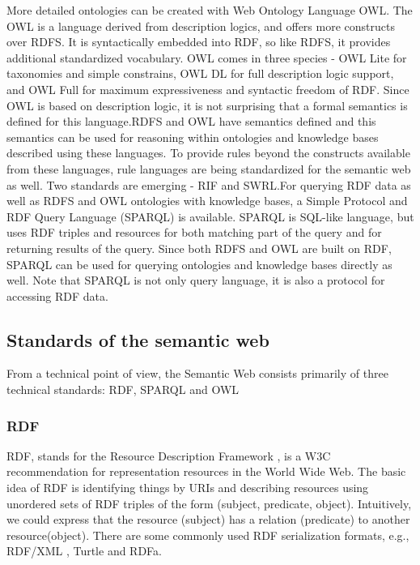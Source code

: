 \documentclass[a4paper,12pt,oneside]{report}
\begin{document}
{{More detailed ontologies can be created with Web Ontology Language OWL. The OWL is a language derived from description logics, and offers more constructs over RDFS. It is syntactically embedded into RDF, so like RDFS, it provides additional standardized vocabulary. OWL comes in three species - OWL Lite for taxonomies and simple constrains, OWL DL for full description logic support, and OWL Full for maximum expressiveness and syntactic freedom of RDF. Since OWL is based on description logic, it is not surprising that a formal semantics is defined for this language.RDFS and OWL have semantics defined and this semantics can be used for reasoning within ontologies and knowledge bases described using these languages. To provide rules beyond the constructs available from these languages, rule languages are being standardized for the semantic web as well. Two standards are emerging - RIF and SWRL.For querying RDF data as well as RDFS and OWL ontologies with knowledge bases, a Simple Protocol and RDF Query Language (SPARQL) is available. SPARQL is SQL-like language, but uses RDF triples and resources for both matching part of the query and for returning results of the query. Since both RDFS and OWL are built on RDF, SPARQL can be used for querying ontologies and knowledge bases directly as well. Note that SPARQL is not only query language, it is also a protocol for accessing RDF data.}
\subsection{Standards of the semantic web}
{From a technical point of view, the Semantic Web consists primarily of three technical standards: RDF, SPARQL and OWL}
\subsubsection{RDF}
{RDF, stands for the Resource Description Framework , is a W3C  recommendation for representation resources in the World Wide Web. The basic idea of RDF is identifying things by URIs  and describing resources using unordered sets of RDF triples of the form (subject, predicate, object). Intuitively, we could express that the resource (subject) has a relation (predicate) to another resource(object). There are some commonly used RDF serialization formats, e.g., RDF/XML , Turtle  and RDFa.}
}
\end{document}
